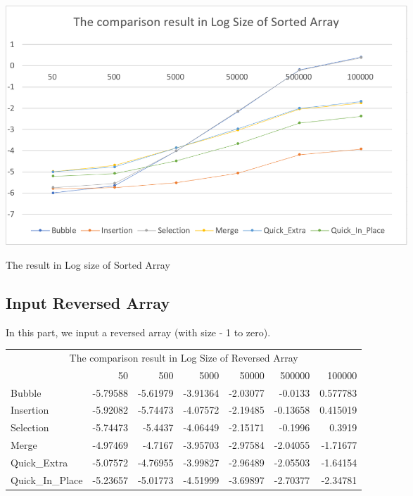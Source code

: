 \documentclass{article}
\begin{document}
\begin{center}
    \includegraphics[height = 9cm]{result3.PNG}
    \caption{The result in Log size of Sorted Array}
\end{center}


\subsection{Input Reversed Array}
In this part, we input a reversed array (with size - 1 to zero).

\begin{table}[H]
  \centering
    \begin{tabular}{l| rrrrrr}
    \multicolumn{7}{c}{The comparison result in Log Size of Reversed Array} \\
          & 50    & 500   & 5000  & 50000  & 500000  & 100000  \\ \hline
    Bubble & -5.79588 & -5.61979 & -3.91364 & -2.03077 & -0.0133 & 0.577783 \\
    Insertion & -5.92082 & -5.74473 & -4.07572 & -2.19485 & -0.13658 & 0.415019 \\
    Selection & -5.74473 & -5.4437 & -4.06449 & -2.15171 & -0.1996 & 0.3919 \\
    Merge & -4.97469 & -4.7167 & -3.95703 & -2.97584 & -2.04055 & -1.71677 \\
    Quick\_Extra & -5.07572 & -4.76955 & -3.99827 & -2.96489 & -2.05503 & -1.64154 \\
    Quick\_In\_Place & -5.23657 & -5.01773 & -4.51999 & -3.69897 & -2.70377 & -2.34781 \\
    \end{tabular}%
  \label{tab:addlabel}%
\end{table}%
\end{document}
